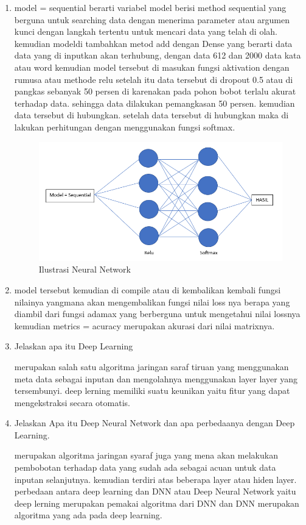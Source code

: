\begin{enumerate}
\item model = sequential berarti variabel model berisi method sequential yang berguna untuk searching data dengan menerima parameter atau argumen kunci dengan langkah tertentu untuk mencari data yang telah di olah. kemudian modeldi tambahkan metod add dengan Dense yang berarti data data yang di inputkan akan terhubung, dengan data 612 dan 2000 data  kata atau word kemudian model tersebut di masukan fungsi aktivation dengan rumusa atau methode relu setelah itu data tersebut di dropout 0.5 atau di pangkas sebanyak 50 persen di karenakan pada pohon bobot terlalu akurat terhadap data. sehingga data dilakukan pemangkasan 50 persen. kemudian data tersebut di hubungkan. setelah data tersebut di hubungkan maka di lakukan perhitungan dengan menggunakan fungsi softmax. 
\begin{figure}[ht]
\centering
\includegraphics[scale=0.4]{figures/1174012/chapter7/1,9.PNG}
\caption{Ilustrasi Neural Network}
\label{Contoh}
\end{figure}


\item model tersebut kemudian di compile atau di kembalikan kembali fungsi nilainya yangmana akan mengembalikan fungsi nilai loss nya berapa yang diambil dari fungsi adamax yang berberguna untuk  mengetahui nilai lossnya kemudian metrics = acuracy merupakan akurasi dari nilai matrixnya.

\item Jelaskan apa itu Deep Learning \par
merupakan salah satu algoritma jaringan saraf tiruan yang menggunakan meta data sebagai inputan dan mengolahnya menggunakan layer layer yang tersembunyi. deep lerning memiliki suatu keunikan yaitu fitur yang dapat mengekstraksi secara otomatis.

\item Jelaskan Apa itu Deep Neural Network dan apa perbedaanya dengan Deep Learning.\par
merupakan algoritma jaringan syaraf juga yang mena akan melakukan pembobotan terhadap data yang sudah ada sebagai acuan untuk data inputan selanjutnya. kemudian terdiri atas beberapa layer atau hiden layer. perbedaan antara deep learning dan DNN atau Deep Neural Network yaitu deep lerning merupakan pemakai algoritma dari DNN dan DNN merupakan algoritma yang ada pada deep learning.


\end{enumerate}
